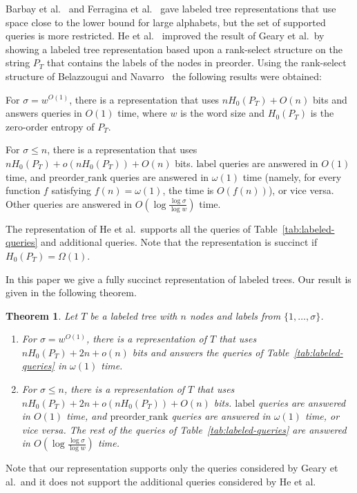 \documentclass[12pt]{article}
\newtheorem{theorem}{Theorem}
\newcommand{\Labelb}{\mathrm{label}}
\newcommand{\preorderrankb}{\mathrm{preorder\_rank}}
\newcommand{\range}[2]{\{#1,\ldots,#2\}}
\begin{document}
Barbay et al.~\cite{BarbayGMR07} and Ferragina et al.~\cite{FerraginaLMM09}
gave labeled tree representations that use space close to the lower bound
for large alphabets,
but the set of supported queries is more restricted.
He et al.~\cite{HeMZ12} improved the result of Geary et al.\ by showing
a labeled tree representation based upon a rank-select structure on
the string $P_T$ that contains the labels of the nodes in preorder.
Using the rank-select structure of Belazzougui and Navarro~\cite{BelazzouguiN12}
the following results were obtained:
\begin{inparaenum}[(1)]
\item
For $\sigma=w^{O(1)}$, there is a representation that uses $n H_0(P_T)+O(n)$
bits and answers queries in $O(1)$ time,
where $w$ is the word size and
$H_0(P_T)$ is the zero-order entropy of $P_T$.
\item
For $\sigma\leq n$, there is a representation that uses
$n H_0(P_T)+o(n H_0(P_T))+O(n)$ bits.
$\Labelb$ queries are answered in $O(1)$ time,
and $\preorderrankb$ queries are answered in $\omega(1)$ time
(namely, for every function $f$ satisfying $f(n)=\omega(1)$, the time is $O(f(n))$), or vice versa. Other queries are answered in
$O(\log\frac{\log\sigma}{\log w})$ time.
\end{inparaenum}
The representation of He et al.\ supports all the queries of
Table~\ref{tab:labeled-queries} and additional queries.
Note that the representation is succinct if $H_0(P_T)=\Omega(1)$.

In this paper we give a fully succinct representation of labeled trees.
Our result is given in the following theorem.
\begin{theorem}
Let $T$ be a labeled tree with $n$ nodes and labels from $\range{1}{\sigma}$.
\begin{enumerate}
\item
For $\sigma=w^{O(1)}$, there is a representation of $T$ that uses
$n H_0(P_T)+2n+o(n)$ bits
and answers the queries of Table~\ref{tab:labeled-queries} in $\omega(1)$ time.
\item
For $\sigma\leq n$, there is a representation of $T$ that
uses $n H_0(P_T)+2n+o(n H_0(P_T))+O(n)$ bits.
$\Labelb$ queries are answered in $O(1)$ time,
and $\preorderrankb$ queries are answered in $\omega(1)$ time,
or vice versa.
The rest of the queries of Table~\ref{tab:labeled-queries} are answered in
$O(\log\frac{\log\sigma}{\log w})$ time.
\end{enumerate}
\end{theorem}
Note that our representation supports only the queries considered by
Geary et al.\ and it does not support the additional queries considered by He et al.
\end{document}
